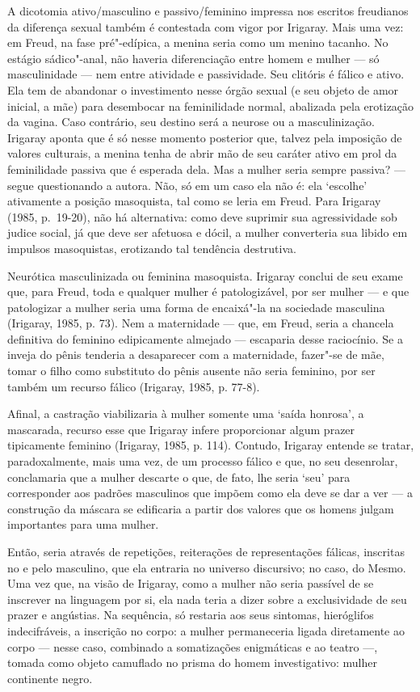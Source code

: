A dicotomia ativo/masculino e passivo/feminino impressa nos escritos
freudianos da diferença sexual também é contestada com vigor por
Irigaray. Mais uma vez: em Freud, na fase pré"-edípica, a menina seria
como um menino tacanho. No estágio sádico"-anal, não haveria
diferenciação entre homem e mulher --- só masculinidade --- nem entre
atividade e passividade. Seu clitóris é fálico e ativo. Ela tem de
abandonar o investimento nesse órgão sexual (e seu objeto de amor
inicial, a mãe) para desembocar na feminilidade normal, abalizada pela
erotização da vagina. Caso contrário, seu destino será a neurose ou a
masculinização. Irigaray aponta que é só nesse momento posterior que,
talvez pela imposição de valores culturais, a menina tenha de abrir mão
de seu caráter ativo em prol da feminilidade passiva que é esperada
dela. Mas a mulher seria sempre passiva? --- segue questionando a autora.
Não, só em um caso ela não é: ela `escolhe' ativamente a posição
masoquista, tal como se leria em Freud. Para Irigaray (1985,
p.~19-20), não há alternativa: como deve suprimir sua agressividade sob
judice social, já que deve ser afetuosa e dócil, a mulher converteria
sua libido em impulsos masoquistas, erotizando tal tendência destrutiva.

Neurótica masculinizada ou feminina masoquista. Irigaray conclui de seu
exame que, para Freud, toda e qualquer mulher é patologizável, por ser
mulher --- e que patologizar a mulher seria uma forma de encaixá"-la na
sociedade masculina (Irigaray, 1985, p. 73). Nem a maternidade ---
que, em Freud, seria a chancela definitiva do feminino edipicamente
almejado --- escaparia desse raciocínio. Se a inveja do pênis tenderia a
desaparecer com a maternidade, fazer"-se de mãe, tomar o filho como
substituto do pênis ausente não seria feminino, por ser também um
recurso fálico (Irigaray, 1985, p. 77-8).

Afinal, a castração viabilizaria à mulher somente uma `saída honrosa', a
mascarada, recurso esse que Irigaray infere proporcionar algum prazer
tipicamente feminino (Irigaray, 1985, p. 114). Contudo, Irigaray
entende se tratar, paradoxalmente, mais uma vez, de um processo fálico e
que, no seu desenrolar, conclamaria que a mulher descarte o que, de
fato, lhe seria `seu' para corresponder aos padrões masculinos que
impõem como ela deve se dar a ver --- a construção da máscara se
edificaria a partir dos valores que os homens julgam importantes para
uma mulher.

Então, seria através de repetições, reiterações de representações
fálicas, inscritas no e pelo masculino, que ela entraria no universo
discursivo; no caso, do Mesmo. Uma vez que, na visão de Irigaray, como a
mulher não seria passível de se inscrever na linguagem por si, ela nada
teria a dizer sobre a exclusividade de seu prazer e angústias. Na
sequência, só restaria aos seus sintomas, hieróglifos indecifráveis, a
inscrição no corpo: a mulher permaneceria ligada diretamente ao corpo
--- nesse caso, combinado a somatizações enigmáticas e ao teatro ---,
tomada como objeto camuflado no prisma do homem investigativo: mulher
continente negro.

